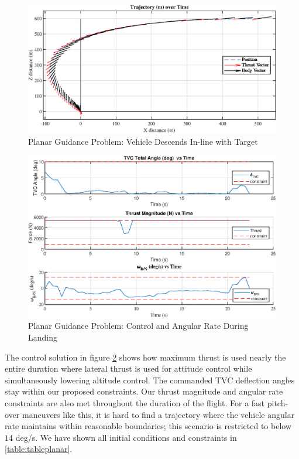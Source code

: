 \clearpage
\begin{figure}[!htbp] 
  \centering
  \includegraphics[width=\textwidth]{figs/planar_traj.eps}
  \caption{Planar Guidance Problem: Vehicle Descends In-line with Target}
  \label{fig:planar}
 \end{figure}
\begin{figure}[!htbp] 
\label{planar_controls}
  \centering
  \includegraphics[width=\textwidth]{figs/planar_controls.eps}
  \caption{Planar Guidance Problem: Control and Angular Rate During Landing}
  \label{fig:planarcontrols}
 \end{figure}
The control solution in figure \ref{fig:planarcontrols} shows how maximum thrust is used nearly the entire duration where lateral thrust is used for attitude control while simultaneously lowering altitude control. The commanded TVC deflection angles stay within our proposed constraints. Our thrust magnitude and angular rate constraints are also met throughout the duration of the flight. For a fast pitch-over maneuvers like this, it is hard to find a trajectory where the vehicle angular rate maintains within reasonable boundaries; this scenario is restricted to below $14$ deg/s. We have shown all initial conditions and constraints in \ref{table:tableplanar}.

